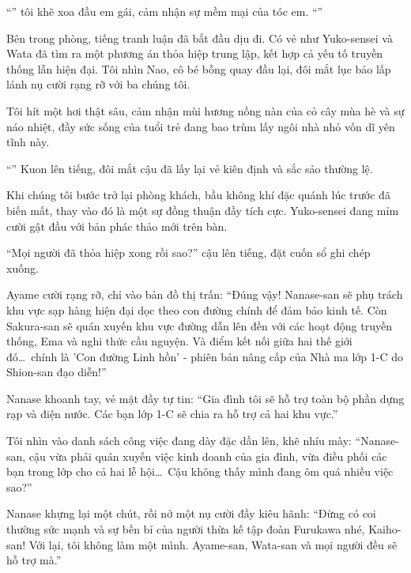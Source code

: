 \documentclass[../main.tex]{subfiles}
\begin{document}
``'' tôi khẽ xoa đầu em gái, cảm nhận sự mềm mại của tóc em. ``''

Bên trong phòng, tiếng tranh luận đã bắt đầu dịu đi. Có vẻ như Yuko-sensei và Wata đã tìm ra một phương án thỏa hiệp trung lập, kết hợp cả yếu tố truyền thống lẫn hiện đại. Tôi nhìn Nao, cô bé bỗng quay đầu lại, đôi mắt lục bảo lấp lánh nụ cười rạng rỡ với ba chúng tôi.

Tôi hít một hơi thật sâu, cảm nhận mùi hương nồng nàn của cỏ cây mùa hè và sự náo nhiệt, đầy sức sống của tuổi trẻ đang bao trùm lấy ngôi nhà nhỏ vốn dĩ yên tĩnh này.

``'' Kuon lên tiếng, đôi mắt cậu đã lấy lại vẻ kiên định và sắc sảo thường lệ.

Khi chúng tôi bước trở lại phòng khách, bầu không khí đặc quánh lúc trước đã biến mất, thay vào đó là một sự đồng thuận đầy tích cực. Yuko-sensei đang mỉm cười gật đầu với bản phác thảo mới trên bàn.

``Mọi người đã thỏa hiệp xong rồi sao?'' cậu lên tiếng, đặt cuốn sổ ghi chép xuống.

Ayame cười rạng rỡ, chỉ vào bản đồ thị trấn: ``Đúng vậy! Nanase-san sẽ phụ trách khu vực sạp hàng hiện đại dọc theo con đường chính để đảm bảo kinh tế. Còn Sakura-san sẽ quán xuyến khu vực đường dẫn lên đền với các hoạt động truyền thống, Ema và nghi thức cầu nguyện. Và điểm kết nối giữa hai thế giới đó\dots\ chính là 'Con đường Linh hồn' - phiên bản nâng cấp của Nhà ma lớp 1-C do Shion-san đạo diễn!''

Nanase khoanh tay, vẻ mặt đầy tự tin: ``Gia đình tôi sẽ hỗ trợ toàn bộ phần dựng rạp và điện nước. Các bạn lớp 1-C sẽ chia ra hỗ trợ cả hai khu vực.''

Tôi nhìn vào danh sách công việc đang dày đặc dần lên, khẽ nhíu mày: ``Nanase-san, cậu vừa phải quán xuyến việc kinh doanh của gia đình, vừa điều phối các bạn trong lớp cho cả hai lễ hội\dots\ Cậu không thấy mình đang ôm quá nhiều việc sao?''

Nanase khựng lại một chút, rồi nở một nụ cười đầy kiêu hãnh: ``Đừng có coi thường sức mạnh và sự bền bỉ của người thừa kế tập đoàn Furukawa nhé, Kaiho-san! Với lại, tôi không làm một mình. Ayame-san, Wata-san và mọi người đều sẽ hỗ trợ mà.''
\end{document}
